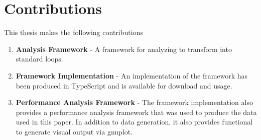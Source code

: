 \section{Contributions}
This thesis makes the following contributions
\begin{enumerate}
  \item \textbf{Analysis Framework} - A framework for analyzing \javascript to transform \pipelines into standard  loops.
  \item \textbf{Framework Implementation} - An implementation\cite{fpo16} of the framework has been produced in TypeScript and is available for download and usage.
  \item \textbf{Performance Analysis Framework} - The framework implementation also provides a performance analysis framework that was used to produce the data used in this paper.  In addition to data generation, it also provides functional to generate visual output via gnuplot.   
\end{enumerate}